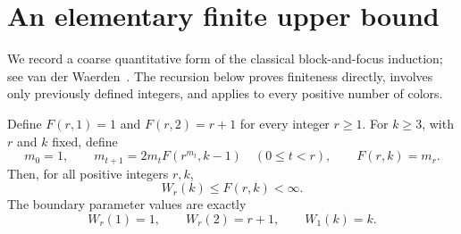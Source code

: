 \section{An elementary finite upper bound}
\label{sec:upper}

We record a coarse quantitative form of the classical block-and-focus
induction; see van der Waerden~\cite[pp.~142--145]{vanDerWaerden1998}.
The recursion below proves finiteness directly, involves only previously
defined integers, and applies to every positive number of colors.

\begin{theorem}
\label{upper:finite}
Define $F(r,1)=1$ and $F(r,2)=r+1$ for every integer $r\ge1$.
For $k\ge3$, with $r$ and $k$ fixed, define
\begin{equation}
 m_0=1,\qquad
 m_{t+1}=2m_tF(r^{m_t},k-1)\quad(0\le t<r),\qquad
 F(r,k)=m_r.
 \label{upper:recursion}
\end{equation}
Then, for all positive integers $r,k$,
\[
 W_r(k)\le F(r,k)<\infty.
\]
The boundary parameter values are exactly
\[
 W_r(1)=1,\qquad W_r(2)=r+1,\qquad W_1(k)=k.
\]
\end{theorem}

